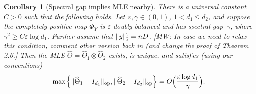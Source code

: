 \documentclass[aos]{imsart}
\newtheorem{corollary}[theorem]{Corollary}
\theoremstyle{definition}
\numberwithin{equation}{section}
\DeclareMathOperator{\op}{op}
\DeclareMathOperator{\tr}{Tr}
\DeclarePairedDelimiter{\abs}{\lvert}{\rvert}
\DeclarePairedDelimiter{\norm}{\lVert}{\rVert}
\newcommand{\htheta}{\widehat{\Theta}}
\newcommand{\ot}{\otimes}
\newcommand{\eps}{\varepsilon}
\newcommand{\MW}[1]{{\color{red}[MW: #1]}}
\newcommand{\MW}[1]{{}}
\begin{document}
\begin{corollary}[Spectral gap implies MLE nearby]\label{cor:klr}
There is a universal constant $C>0$ such that the following holds.
Let~$\eps,\gamma\in(0,1)$, $1 < d_1 \leq d_2$, and suppose the completely positive map $\Phi_Y$ is $\eps$-doubly balanced and has spectral gap~$\gamma$, where $\gamma^2 \geq C \eps \log d_1$.
Further assume that $\norm{y}_2^2 = nD$.
\MW{In case we need to relax this condition, comment other version back in (and change the proof of Theorem 2.6.}
Then the MLE $\htheta = \htheta_1 \ot \htheta_2$ exists, is unique, and satisfies (using our conventions)
\begin{align*}
  \max \, \Bigl\{ \norm{\htheta_1 - I_{d_1}}_{\op}, \norm{\htheta_2 - I_{d_2}}_{\op} \Bigr\}
= O\Bigl(\frac{\eps \log d_1}\gamma\Bigr).
\end{align*}
\end{corollary}
\end{document}
